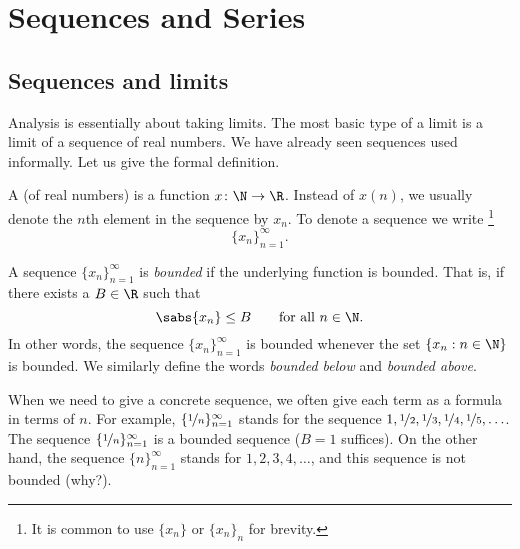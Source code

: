 \chapter{Sequences and Series} \label{seq:chapter}


\section{Sequences and limits}
\label{sec:seqsandlims}



Analysis is essentially about taking limits.  The most basic type of a limit
is a limit of a sequence of real numbers.
We have already seen sequences used informally.  Let us give the formal
definition.

\begin{defn}
A \emph{} (of real numbers) is a function $x \colon \N \to
\R$.  Instead of $x(n)$, we 
usually denote the $n$th element in the sequence by $x_n$.
To denote a sequence we write%
\footnote{It is common to use $\{ x_n \}$ or $\{ x_n \}_n$ for brevity.}%
%
\begin{equation*}
\{ x_n \}_{n=1}^\infty.
\end{equation*}

A sequence $\{ x_n \}_{n=1}^\infty$ is \emph{bounded} if
the underlying function is bounded.  That is, if
there exists a $B \in \R$ such that
\begin{equation*}
\sabs{x_n} \leq B \qquad \text{for all } n \in \N.
\end{equation*}
In other words, the sequence $\{x_n\}_{n=1}^\infty$ is bounded whenever
the set $\{ x_n : n \in \N \}$
is bounded.
We similarly define the words
\emph{bounded below} and
\emph{bounded above}.
\end{defn}

When we need
to give a concrete sequence, we often give each term as a formula in
terms of $n$.
For example, $\{ \nicefrac{1}{n} \}_{n=1}^\infty$ stands for
the sequence $1, \nicefrac{1}{2}, \nicefrac{1}{3}, \nicefrac{1}{4},
\nicefrac{1}{5}, \ldots$.
The sequence $\{ \nicefrac{1}{n} \}_{n=1}^\infty$
is a bounded sequence ($B=1$ suffices).  On the other hand, the sequence
$\{ n \}_{n=1}^\infty$ stands for
$1,2,3,4,\ldots$, and this sequence is not bounded (why?).

